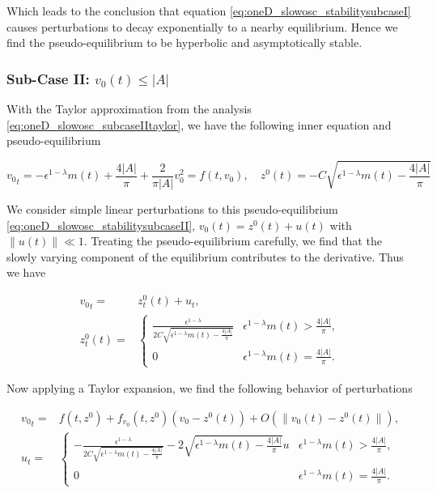 Which leads to the conclusion that equation \eqref{eq:oneD_slowosc_stabilitysubcaseI} causes perturbations to decay exponentially to a nearby equilibrium. Hence we find the pseudo-equilibrium to be hyperbolic and asymptotically stable.

\subsubsection*{Sub-Case II: $v_0(t)\le  |A|$}

With the Taylor approximation from the analysis \eqref{eq:oneD_slowosc_subcaseIItaylor}, we have the following inner equation and pseudo-equilibrium

\begin{equation}\label{eq:oneD_slowosc_stabilitysubcaseII}
{v_0}_t= -\epsilon^{1-\lambda}m(t) +\frac{4|A|}{\pi}+\frac{2}{\pi |A|}v_0^2=f(t,v_0),\quad z^0(t)=-C \sqrt{\epsilon^{1-\lambda}m(t)-\frac{4|A|}{\pi}}
\end{equation}

We consider simple linear perturbations to this pseudo-equilibrium \eqref{eq:oneD_slowosc_stabilitysubcaseII}, $v_0(t)=z^0(t)+u(t)$ with $\lVert u(t) \rVert \ll 1$. Treating the pseudo-equilibrium carefully, we find that the slowly varying component of the equilibrium contributes to the derivative. Thus we have

\begin{equation}
\begin{aligned}
{v_0}_t =& z^0_t(t) +u_t,\\
z^0_t(t) = & \begin{cases}
\frac{\epsilon^{1-\lambda}}{2C\sqrt{\epsilon^{1-\lambda}m(t)-\frac{4|A|}{\pi}}} & \epsilon^{1-\lambda}m(t)> \frac{4|A|}{\pi},\\
0 & \epsilon^{1-\lambda}m(t) =\frac{4|A|}{\pi}.
\end{cases}
\end{aligned}
\end{equation}

Now applying a Taylor expansion, we find the following behavior of perturbations

\begin{equation}\label{eq:oneD_slowosc_stabilitysubcaseIIeq}
\begin{aligned}
{v_0}_t =& f(t,z^0)+f_{v_0}(t,z^0)(v_0-z^0(t))+O(\lVert v_0(t)-z^0(t) \rVert),\\
u_t =&\begin{cases}
-\frac{\epsilon^{1-\lambda}}{2C\sqrt{\epsilon^{1-\lambda}m(t)-\frac{4|A|}{\pi}}}-2\sqrt{\epsilon^{1-\lambda}m(t)-\frac{4|A|}{\pi}} u & \epsilon^{1-\lambda}m(t)>\frac{4|A|}{\pi},\\
0 & \epsilon^{1-\lambda}m(t)=\frac{4|A|}{\pi}.
\end{cases}
\end{aligned}
\end{equation}

